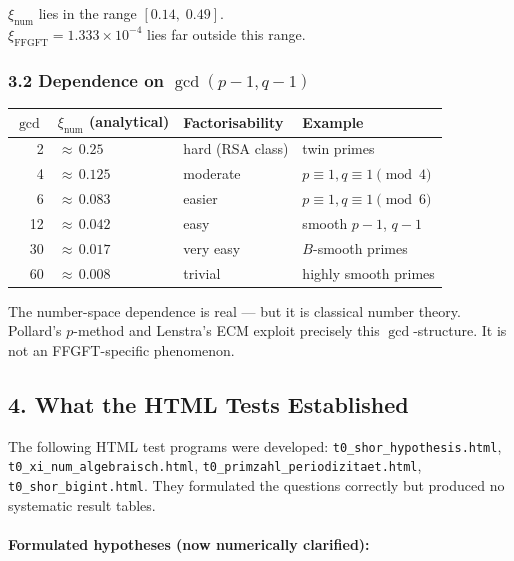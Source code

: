 \begin{mdframed}[style=warn]
$\xi_\text{num}$ lies in the range $[0.14,\; 0.49]$. \\
$\xi_\text{FFGFT} = 1.333 \times 10^{-4}$ lies far outside this range.
\end{mdframed}

\subsubsection*{3.2 Dependence on $\gcd(p-1, q-1)$}

\begin{center}
\begin{tabular}{rlll}
\toprule
$\gcd$ & $\xi_\text{num}$ (analytical) & Factorisability & Example \\
\midrule
2  & ${\approx}\,0.25$  & hard (RSA class)   & twin primes \\
4  & ${\approx}\,0.125$ & moderate           & $p \equiv 1, q \equiv 1 \pmod{4}$ \\
6  & ${\approx}\,0.083$ & easier             & $p \equiv 1, q \equiv 1 \pmod{6}$ \\
12 & ${\approx}\,0.042$ & easy               & smooth $p{-}1$, $q{-}1$ \\
30 & ${\approx}\,0.017$ & very easy          & $B$-smooth primes \\
60 & ${\approx}\,0.008$ & trivial            & highly smooth primes \\
\bottomrule
\end{tabular}
\end{center}

The number-space dependence is real — but it is classical number theory.
Pollard's $p$-method and Lenstra's ECM exploit precisely this $\gcd$-structure.
It is not an FFGFT-specific phenomenon.

\subsection*{4. What the HTML Tests Established}

The following HTML test programs were developed:
\texttt{t0\_shor\_hypothesis.html}, \texttt{t0\_xi\_num\_algebraisch.html},
\texttt{t0\_primzahl\_periodizitaet.html}, \texttt{t0\_shor\_bigint.html}.
They formulated the questions correctly but produced no systematic result tables.

\paragraph{Formulated hypotheses (now numerically clarified):}

